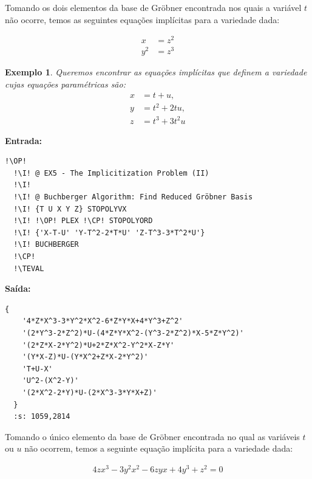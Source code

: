 \documentclass[12pt,a4paper]{report}
\newcommand{\kwd}[1]{\texttt{\textcolor{keyword}{#1}}}
\newcommand{\I}{\enspace\textcolor{indent}\vrule\hspace{2pt}}
\newcommand{\TEVAL}{\kwd{TEVAL}}   %
\newcommand{\OP}{\kwd{$\ll$}}   %
\newcommand{\CP}{\kwd{$\gg$}}   %
\newtheorem{example}[theorem]{Exemplo}
\numberwithin{theorem}{chapter}
\begin{document}
Tomando os dois elementos da base de Gröbner encontrada nos quais a
variável \(t\) não ocorre, temos as seguintes equações implícitas para
a variedade dada:

\begin{align*}
  x&=z^2\\
  y^2&=z^3
\end{align*}


\begin{example}
  Queremos encontrar as equações implícitas que definem a variedade
  cujas equações paramétricas são:
  \begin{align*}
    x &= t + u,\\
    y &= t^2 + 2 t u,\\
    z &= t^3 + 3 t^2 u
  \end{align*}
\end{example}

\noindent\textbf{Entrada:}

\begin{lstlisting}[language=userrpl]
  !\OP!
  !\I! @ EX5 - The Implicitization Problem (II)
  !\I!
  !\I! @ Buchberger Algorithm: Find Reduced Gröbner Basis
  !\I! {T U X Y Z} STOPOLYVX
  !\I! !\OP! PLEX !\CP! STOPOLYORD
  !\I! {'X-T-U' 'Y-T^2-2*T*U' 'Z-T^3-3*T^2*U'}
  !\I! BUCHBERGER
  !\CP!
  !\TEVAL
\end{lstlisting}

\noindent\textbf{Saída:}

\begin{lstlisting}[language=userrpl]
  {
    '4*Z*X^3-3*Y^2*X^2-6*Z*Y*X+4*Y^3+Z^2'
    '(2*Y^3-2*Z^2)*U-(4*Z*Y*X^2-(Y^3-2*Z^2)*X-5*Z*Y^2)'
    '(2*Z*X-2*Y^2)*U+2*Z*X^2-Y^2*X-Z*Y'
    '(Y*X-Z)*U-(Y*X^2+Z*X-2*Y^2)'
    'T+U-X'
    'U^2-(X^2-Y)'
    '(2*X^2-2*Y)*U-(2*X^3-3*Y*X+Z)'
  }
  :s: 1059,2814
\end{lstlisting}

Tomando o único elemento da base de Gröbner encontrada no qual as
variáveis \(t\) ou \(u\) não ocorrem, temos a seguinte equação
implícita para a variedade dada:

\begin{align*}
  4 z x^3 - 3y^2x^2-6z y x+4y^3+z^2 = 0
\end{align*}



\end{document}

